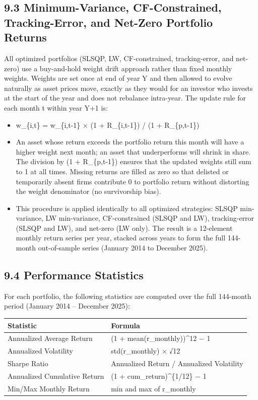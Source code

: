 \documentclass[
  11pt,
]{article}
\begin{document}
\hypertarget{minimum-variance-cf-constrained-tracking-error-and-net-zero-portfolio-returns}{%
\subsection{9.3 Minimum-Variance, CF-Constrained, Tracking-Error, and
Net-Zero Portfolio
Returns}\label{minimum-variance-cf-constrained-tracking-error-and-net-zero-portfolio-returns}}

All optimized portfolios (SLSQP, LW, CF-constrained, tracking-error, and
net-zero) use a buy-and-hold weight drift approach rather than fixed
monthly weights. Weights are set once at end of year Y and then allowed
to evolve naturally as asset prices move, exactly as they would for an
investor who invests at the start of the year and does not rebalance
intra-year. The update rule for each month t within year Y+1 is:

\begin{itemize}
\item
  w\_\{i,t\} = w\_\{i,t-1\} × (1 + R\_\{i,t-1\}) / (1 + R\_\{p,t-1\})
\item
  An asset whose return exceeds the portfolio return this month will
  have a higher weight next month; an asset that underperforms will
  shrink in share. The division by (1 + R\_\{p,t-1\}) ensures that the
  updated weights still sum to 1 at all times. Missing returns are
  filled as zero so that delisted or temporarily absent firms contribute
  0 to portfolio return without distorting the weight denominator (no
  survivorship bias).
\item
  This procedure is applied identically to all optimized strategies:
  SLSQP min-variance, LW min-variance, CF-constrained (SLSQP and LW),
  tracking-error (SLSQP and LW), and net-zero (LW only). The result is a
  12-element monthly return series per year, stacked across years to
  form the full 144-month out-of-sample series (January 2014 to December
  2025).
\end{itemize}

\hypertarget{performance-statistics}{%
\subsection{9.4 Performance Statistics}\label{performance-statistics}}

For each portfolio, the following statistics are computed over the full
144-month period (January 2014 -- December 2025):

\begin{longtable}[]{@{}ll@{}}
\toprule
\textbf{Statistic} & \textbf{Formula}\tabularnewline
\midrule
\endhead
Annualized Average Return & (1 + mean(r\_monthly))\^{}12 −
1\tabularnewline
Annualized Volatility & std(r\_monthly) × √12\tabularnewline
Sharpe Ratio & Annualized Return / Annualized Volatility\tabularnewline
Annualized Cumulative Return & (1 + cum\_return)\^{}\{1/12\} −
1\tabularnewline
Min/Max Monthly Return & min and max of r\_monthly\tabularnewline
\bottomrule
\end{longtable}
\end{document}

